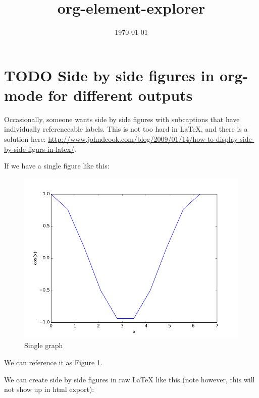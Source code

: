 \documentclass[11pt]{article}
\date{\today}
\title{org-element-explorer}
\begin{document}
\section{{\bfseries\sffamily TODO} Side by side figures in org-mode for different outputs}
\label{sec-1}
Occasionally, someone wants side by side figures with subcaptions that have individually referenceable labels. This is not too hard in \LaTeX{}, and there is a solution here:  \url{http://www.johndcook.com/blog/2009/01/14/how-to-display-side-by-side-figurs-in-latex/}.

If we have a single figure like this:

\begin{figure}[htb]
\centering
\includegraphics[width=.9\linewidth]{./images/cos-plot.png}
\caption{Single graph \label{fig:one}}
\end{figure}

We can reference it as Figure \ref{fig:one}.

We can create side by side figures in raw \LaTeX{} like this (note however, this will not show up in html export):
\end{document}

